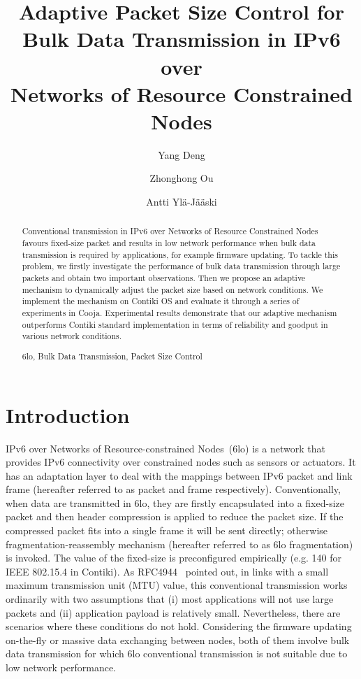 \documentclass[runningheads,a4paper]{llncs}
\newcommand{\keywords}[1]{\par\addvspace\baselineskip
\noindent\keywordname\enspace\ignorespaces#1}
\begin{document}
\mainmatter

\title{Adaptive Packet Size Control for \\Bulk Data Transmission in IPv6 over\\Networks of Resource Constrained Nodes}

\author{Yang Deng\and Zhonghong Ou\and Antti Yl\"a-J\"a\"aski}


\maketitle

\begin{abstract}
Conventional transmission in IPv6 over Networks of Resource Constrained Nodes favours fixed-size packet and results in low network performance when bulk data transmission is required by applications, for example firmware updating. To tackle this problem, we firstly investigate the performance of bulk data transmission through large packets and obtain two important observations. Then we propose an adaptive mechanism to dynamically adjust the packet size based on network conditions. We implement the mechanism on Contiki OS and evaluate it through a series of experiments in Cooja. Experimental results demonstrate that our adaptive mechanism outperforms Contiki standard implementation in terms of reliability and goodput in various network conditions.

\keywords{6lo, Bulk Data Transmission, Packet Size Control}
\end{abstract}

\section{Introduction}
IPv6 over Networks of Resource-constrained Nodes~(6lo) is a network that provides IPv6 connectivity over constrained nodes such as sensors or actuators. It has an adaptation layer to deal with the mappings between IPv6 packet and link frame (hereafter referred to as packet and frame respectively). Conventionally, when data are transmitted in 6lo, they are firstly encapsulated into a fixed-size packet and then header compression is applied to reduce the packet size. If the compressed packet fits into a single frame it will be sent directly; otherwise fragmentation-reassembly mechanism (hereafter referred to as 6lo fragmentation) is invoked. The value of the fixed-size is preconfigured empirically (e.g. 140 for IEEE 802.15.4 in Contiki). As RFC4944~\cite{Rfc4944} pointed out, in links with a small maximum transmission unit (MTU) value, this conventional transmission works ordinarily with two assumptions that (i) most applications will not use large packets and (ii) application payload is relatively small. Nevertheless, there are scenarios where these conditions do not hold. Considering the firmware updating on-the-fly or massive data exchanging between nodes, both of them involve bulk data transmission for which 6lo conventional transmission is not suitable due to low network performance.
\end{document}
